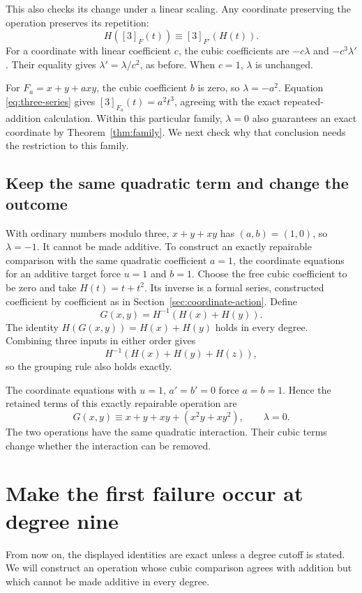\documentclass[11pt,letterpaper]{article}
\numberwithin{equation}{section}
\theoremstyle{definition}\newtheorem{example}[theorem]{Example}
\begin{document}
This also checks its change under a linear scaling. Any coordinate preserving the operation preserves its repetition:
\[
 H([3]_F(t))\equiv[3]_{F'}(H(t)).
\]
For a coordinate with linear coefficient \(c\), the cubic coefficients are \(-c\lambda\) and \(-c^3\lambda'\). Their equality gives \(\lambda'=\lambda/c^2\), as before. When \(c=1\), \(\lambda\) is unchanged.

For \(F_a=x+y+a xy\), the cubic coefficient \(b\) is zero, so \(\lambda=-a^2\). Equation \eqref{eq:three-series} gives \([3]_{F_a}(t)=a^2t^3\), agreeing with the exact repeated-addition calculation. Within this particular family, \(\lambda=0\) also guarantees an exact coordinate by Theorem~\ref{thm:family}. We next check why that conclusion needs the restriction to this family.

\subsection{Keep the same quadratic term and change the outcome}

With ordinary numbers modulo three, \(x+y+xy\) has \((a,b)=(1,0)\), so \(\lambda=-1\). It cannot be made additive. To construct an exactly repairable comparison with the same quadratic coefficient \(a=1\), the coordinate equations for an additive target force \(u=1\) and \(b=1\). Choose the free cubic coefficient to be zero and take \(H(t)=t+t^2\). Its inverse is a formal series, constructed coefficient by coefficient as in Section~\ref{sec:coordinate-action}. Define
\begin{equation}\label{eq:pullback-example}
 G(x,y)=H^{-1}(H(x)+H(y)).
\end{equation}
The identity \(H(G(x,y))=H(x)+H(y)\) holds in every degree. Combining three inputs in either order gives
\[
 H^{-1}(H(x)+H(y)+H(z)),
\]
so the grouping rule also holds exactly.

The coordinate equations with \(u=1\), \(a'=b'=0\) force \(a=b=1\). Hence the retained terms of this exactly repairable operation are
\[
 G(x,y)\equiv x+y+xy+(x^2y+xy^2),\qquad\lambda=0.
\]
The two operations have the same quadratic interaction. Their cubic terms change whether the interaction can be removed.

\section{Make the first failure occur at degree nine}\label{sec:later-obstruction}

From now on, the displayed identities are exact unless a degree cutoff is stated. We will construct an operation whose cubic comparison agrees with addition but which cannot be made additive in every degree.
\end{document}
